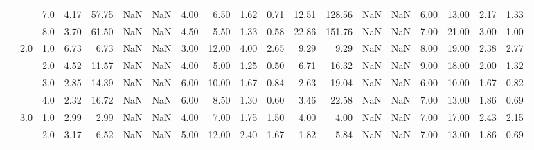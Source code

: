 \begin{tabular}{lllrrrrrrrrrrrrrrrr}
          &     & 7.0  &      4.17 &      57.75 &               NaN &                NaN &  4.00 &   6.50 &             1.62 &                         0.71 &     12.51 &     128.56 &               NaN &                NaN &  6.00 &  13.00 &             2.17 &                         1.33 \\
          &     & 8.0  &      3.70 &      61.50 &               NaN &                NaN &  4.50 &   5.50 &             1.33 &                         0.58 &     22.86 &     151.76 &               NaN &                NaN &  7.00 &  21.00 &             3.00 &                         1.00 \\
          & 2.0 & 1.0  &      6.73 &       6.73 &               NaN &                NaN &  3.00 &  12.00 &             4.00 &                         2.65 &      9.29 &       9.29 &               NaN &                NaN &  8.00 &  19.00 &             2.38 &                         2.77 \\
          &     & 2.0  &      4.52 &      11.57 &               NaN &                NaN &  4.00 &   5.00 &             1.25 &                         0.50 &      6.71 &      16.32 &               NaN &                NaN &  9.00 &  18.00 &             2.00 &                         1.32 \\
          &     & 3.0  &      2.85 &      14.39 &               NaN &                NaN &  6.00 &  10.00 &             1.67 &                         0.84 &      2.63 &      19.04 &               NaN &                NaN &  6.00 &  10.00 &             1.67 &                         0.82 \\
          &     & 4.0  &      2.32 &      16.72 &               NaN &                NaN &  6.00 &   8.50 &             1.30 &                         0.60 &      3.46 &      22.58 &               NaN &                NaN &  7.00 &  13.00 &             1.86 &                         0.69 \\
          & 3.0 & 1.0  &      2.99 &       2.99 &               NaN &                NaN &  4.00 &   7.00 &             1.75 &                         1.50 &      4.00 &       4.00 &               NaN &                NaN &  7.00 &  17.00 &             2.43 &                         2.15 \\
          &     & 2.0  &      3.17 &       6.52 &               NaN &                NaN &  5.00 &  12.00 &             2.40 &                         1.67 &      1.82 &       5.84 &               NaN &                NaN &  7.00 &  13.00 &             1.86 &                         0.69 \\

\end{tabular}
